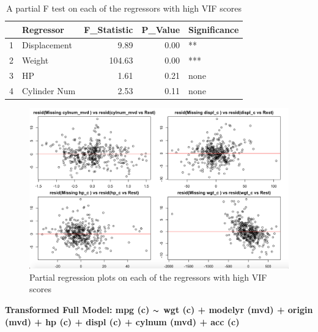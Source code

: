 \documentclass{article}
\newcommand{\mt}[1]{\ensuremath{#1}}
\newcommand{\tl}{\mt{\thicksim} }
\begin{document}
\clearpage
\newpage 

\begin{table}[ht]
\centering
\begin{tabular}{rlrrl}
  \hline
 & Regressor & F\_Statistic & P\_Value & Significance \\ 
  \hline
1 & Displacement & 9.89 & 0.00 & ** \\ 
  2 & Weight & 104.63 & 0.00 & *** \\ 
  3 & HP & 1.61 & 0.21 & none \\ 
  4 & Cylinder Num & 2.53 & 0.11 & none \\ 
   \hline
\end{tabular}
\caption{A partial F test on each of the regressors with high VIF scores}
\label{tab:partialfhighvif}
\end{table}

\begin{figure}
	\centering
	\includegraphics[width=1\linewidth]{11-14p_PrRgall4}
	\caption[Partial regression plots on high VIF regressors]
	{Partial regression plots on each of the regressors with high VIF scores}
\end{figure}

\clearpage
\newpage

\textbf{Transformed Full Model: mpg (c) \tl wgt (c) + modelyr (mvd) + origin (mvd) + hp (c) + displ (c) + cylnum (mvd) + acc (c)}

\clearpage
\newpage 
\end{document}
